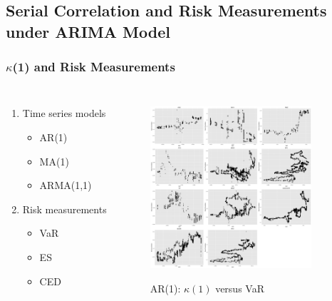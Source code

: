 \documentclass{beamer}
\newcommand\Fontviii{\fontsize{8}{9.2}\selectfont}
\begin{document}
\subsection{Serial Correlation and Risk Measurements under ARIMA Model}
\begin{frame}
\frametitle{$\kappa$(1) and Risk Measurements}
\Fontviii
\begin{columns}[c] %

\begin{enumerate}
\item Time series models
\begin{itemize}
\item AR(1)
\item MA(1)
\item ARMA(1,1)
\end{itemize}
\item Risk measurements
\begin{itemize}
\item VaR
\item ES
\item CED
\end{itemize}
\end{enumerate}

\begin{figure}[h]
\centering 
\includegraphics[width=6cm]{../results/SerCol-VaR5yrAR1}
\label{fig:SerCol-VaR5yrAR1}
\caption{AR(1): $\kappa(1)$ versus VaR}
\end{figure}
\end{columns}
\end{frame}
\end{document}
